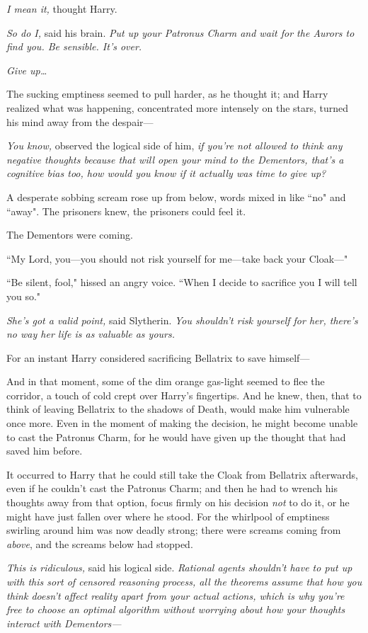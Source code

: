 \emph{I mean it,} thought Harry.

\emph{So do I,} said his brain. \emph{Put up your Patronus Charm and wait for the Aurors to find you. Be sensible. It's over.}

\emph{Give up{\ldots}}

The sucking emptiness seemed to pull harder, as he thought it; and Harry realized what was happening, concentrated more intensely on the stars, turned his mind away from the despair---

\emph{You know,} observed the logical side of him, \emph{if you're not allowed to think \emph{any} negative thoughts because that will open your mind to the Dementors, \emph{that's} a cognitive bias too, how would you know if it actually \emph{was} time to give up?}

A desperate sobbing scream rose up from below, words mixed in like ``no" and ``away". The prisoners knew, the prisoners could feel it.

The Dementors were coming.

``My Lord, you---you should not risk yourself for me---take back your Cloak---"

``Be silent, fool," hissed an angry voice. ``When I decide to sacrifice you I will tell you so."

\emph{She's got a valid point,} said Slytherin. \emph{You \emph{shouldn't} risk yourself for her, there's no way her life is as valuable as yours.}

For an instant Harry considered sacrificing Bellatrix to save himself---

And in that moment, some of the dim orange gas-light seemed to flee the corridor, a touch of cold crept over Harry's fingertips. And he knew, then, that to think of leaving Bellatrix to the shadows of Death, would make him vulnerable once more. Even in the moment of making the decision, he might become unable to cast the Patronus Charm, for he would have given up the thought that had saved him before.

It occurred to Harry that he could still take the Cloak from Bellatrix afterwards, even if he couldn't cast the Patronus Charm; and then he had to wrench his thoughts away from that option, focus firmly on his decision \emph{not} to do it, or he might have just fallen over where he stood. For the whirlpool of emptiness swirling around him was now deadly strong; there were screams coming from \emph{above}, and the screams below had stopped.

\emph{This is ridiculous,} said his logical side. \emph{Rational agents shouldn't have to put up with this sort of censored reasoning process, all the theorems assume that how you think doesn't affect reality apart from your actual actions, which is why you're free to choose an optimal algorithm without worrying about how your thoughts interact with Dementors---}

